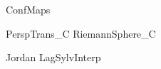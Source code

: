 \documentclass{newsiambook}
\begin{document}


{ConfMaps}

{PerspTrans_C}
{RiemannSphere_C}


\begin{matlab}

\end{matlab}

\begin{python} 

\end{python}



{Jordan}
{LagSylvInterp}
\end{document}
